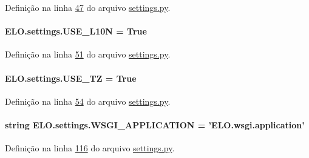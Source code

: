 Definição na linha \hyperlink{settings_8py_source_l00047}{47} do arquivo \hyperlink{settings_8py_source}{settings.\-py}.

\hypertarget{namespaceELO_1_1settings_a863197f2699808509a4c32b38c16eb44}{
\paragraph[{U\-S\-E\-\_\-\-L10\-N}]{\setlength{\rightskip}{0pt plus 5cm}E\-L\-O.\-settings.\-U\-S\-E\-\_\-\-L10\-N = True}}\label{namespaceELO_1_1settings_a863197f2699808509a4c32b38c16eb44}


Definição na linha \hyperlink{settings_8py_source_l00051}{51} do arquivo \hyperlink{settings_8py_source}{settings.\-py}.

\hypertarget{namespaceELO_1_1settings_a8da4c6fc66af84d08bddc0249a473553}{
\paragraph[{U\-S\-E\-\_\-\-T\-Z}]{\setlength{\rightskip}{0pt plus 5cm}E\-L\-O.\-settings.\-U\-S\-E\-\_\-\-T\-Z = True}}\label{namespaceELO_1_1settings_a8da4c6fc66af84d08bddc0249a473553}


Definição na linha \hyperlink{settings_8py_source_l00054}{54} do arquivo \hyperlink{settings_8py_source}{settings.\-py}.

\hypertarget{namespaceELO_1_1settings_a065d3c6028b923c4918002832d2527be}{
\paragraph[{W\-S\-G\-I\-\_\-\-A\-P\-P\-L\-I\-C\-A\-T\-I\-O\-N}]{\setlength{\rightskip}{0pt plus 5cm}string E\-L\-O.\-settings.\-W\-S\-G\-I\-\_\-\-A\-P\-P\-L\-I\-C\-A\-T\-I\-O\-N = '{\bf E\-L\-O.\-wsgi.\-application}'}}\label{namespaceELO_1_1settings_a065d3c6028b923c4918002832d2527be}


Definição na linha \hyperlink{settings_8py_source_l00116}{116} do arquivo \hyperlink{settings_8py_source}{settings.\-py}.

